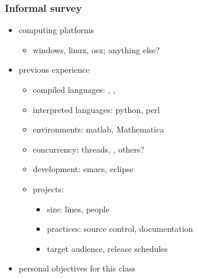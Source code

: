 \begin{frame}[fragile]
%
  \frametitle{Informal survey}
%
  \begin{itemize}
%
  \item computing platforms
    \begin{itemize}
      \item windows, linux, osx; anything else?
    \end{itemize}
%
  \item previous experience
    \begin{itemize}
      \item compiled languages: \cc, \cpp, \fortran
      \item interpreted languages: python, perl
      \item environments: matlab, Mathematica
      \item concurrency: threads, \mpi, others?
      \item development: emacs, eclipse
      \item projects:
        \begin{itemize}
        \item size: lines, people
        \item practices: source control, documentation
        \item target audience, release schedules
        \end{itemize}
    \end{itemize}
%
  \item personal objectives for this class
%
  \end{itemize}
%
\end{frame}

